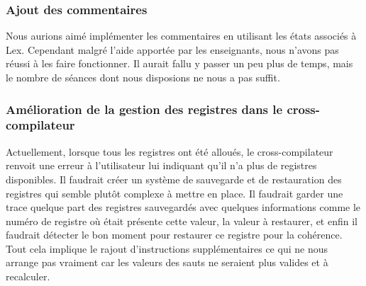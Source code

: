 \subsubsection*{Ajout des commentaires}

Nous aurions aimé implémenter les commentaires en utilisant les états associés à Lex. Cependant malgré l’aide apportée par les enseignants, nous n’avons pas réussi à les faire fonctionner. Il aurait fallu y passer un peu plus de temps, mais le nombre de séances dont nous disposions ne nous a pas suffit.

\subsubsection*{Amélioration de la gestion des registres dans le cross-compilateur}

Actuellement, lorsque tous les registres ont été alloués, le cross-compilateur renvoit une erreur à l'utilisateur lui indiquant qu'il n'a plus de registres disponibles. Il faudrait créer un système de sauvegarde et de restauration des registres qui semble plutôt complexe à mettre en place. Il faudrait garder une trace quelque part des registres sauvegardés avec quelques informations comme le numéro de registre où était présente cette valeur, la valeur à restaurer, et enfin il faudrait détecter le bon moment pour restaurer ce registre pour la cohérence. Tout cela implique le rajout d'instructions supplémentaires ce qui ne nous arrange pas vraiment car les valeurs des sauts ne seraient plus valides et à recalculer.